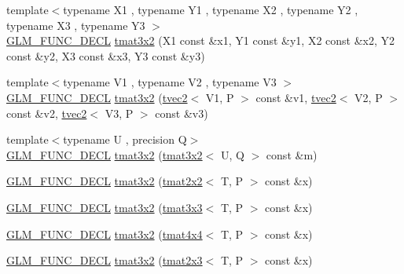 \begin{DoxyCompactItemize}
\item 
{\footnotesize template$<$typename X1 , typename Y1 , typename X2 , typename Y2 , typename X3 , typename Y3 $>$ }\\\hyperlink{setup_8hpp_ab2d052de21a70539923e9bcbf6e83a51}{G\+L\+M\+\_\+\+F\+U\+N\+C\+\_\+\+D\+E\+CL} \hyperlink{structglm_1_1detail_1_1tmat3x2_a775df36ef9146cd819095a1ffa971558}{tmat3x2} (X1 const \&x1, Y1 const \&y1, X2 const \&x2, Y2 const \&y2, X3 const \&x3, Y3 const \&y3)
\item 
{\footnotesize template$<$typename V1 , typename V2 , typename V3 $>$ }\\\hyperlink{setup_8hpp_ab2d052de21a70539923e9bcbf6e83a51}{G\+L\+M\+\_\+\+F\+U\+N\+C\+\_\+\+D\+E\+CL} \hyperlink{structglm_1_1detail_1_1tmat3x2_af632d84043506726bd86e34fad3a532f}{tmat3x2} (\hyperlink{structglm_1_1detail_1_1tvec2}{tvec2}$<$ V1, P $>$ const \&v1, \hyperlink{structglm_1_1detail_1_1tvec2}{tvec2}$<$ V2, P $>$ const \&v2, \hyperlink{structglm_1_1detail_1_1tvec2}{tvec2}$<$ V3, P $>$ const \&v3)
\item 
{\footnotesize template$<$typename U , precision Q$>$ }\\\hyperlink{setup_8hpp_ab2d052de21a70539923e9bcbf6e83a51}{G\+L\+M\+\_\+\+F\+U\+N\+C\+\_\+\+D\+E\+CL} \hyperlink{structglm_1_1detail_1_1tmat3x2_ad2448500048ef60090e4d44bedd5868c}{tmat3x2} (\hyperlink{structglm_1_1detail_1_1tmat3x2}{tmat3x2}$<$ U, Q $>$ const \&m)
\item 
\hyperlink{setup_8hpp_ab2d052de21a70539923e9bcbf6e83a51}{G\+L\+M\+\_\+\+F\+U\+N\+C\+\_\+\+D\+E\+CL} \hyperlink{structglm_1_1detail_1_1tmat3x2_abf0450ece5ddcb211561d3e8f2ef80d4}{tmat3x2} (\hyperlink{structglm_1_1detail_1_1tmat2x2}{tmat2x2}$<$ T, P $>$ const \&x)
\item 
\hyperlink{setup_8hpp_ab2d052de21a70539923e9bcbf6e83a51}{G\+L\+M\+\_\+\+F\+U\+N\+C\+\_\+\+D\+E\+CL} \hyperlink{structglm_1_1detail_1_1tmat3x2_ade7bd106866ef9d3333332d20a52153e}{tmat3x2} (\hyperlink{structglm_1_1detail_1_1tmat3x3}{tmat3x3}$<$ T, P $>$ const \&x)
\item 
\hyperlink{setup_8hpp_ab2d052de21a70539923e9bcbf6e83a51}{G\+L\+M\+\_\+\+F\+U\+N\+C\+\_\+\+D\+E\+CL} \hyperlink{structglm_1_1detail_1_1tmat3x2_a58d20ac5dcb7504ec91670e49e353f7b}{tmat3x2} (\hyperlink{structglm_1_1detail_1_1tmat4x4}{tmat4x4}$<$ T, P $>$ const \&x)
\item 
\hyperlink{setup_8hpp_ab2d052de21a70539923e9bcbf6e83a51}{G\+L\+M\+\_\+\+F\+U\+N\+C\+\_\+\+D\+E\+CL} \hyperlink{structglm_1_1detail_1_1tmat3x2_a2accfb7c3f02afa377299db31c7ed798}{tmat3x2} (\hyperlink{structglm_1_1detail_1_1tmat2x3}{tmat2x3}$<$ T, P $>$ const \&x)

\end{DoxyCompactItemize}
